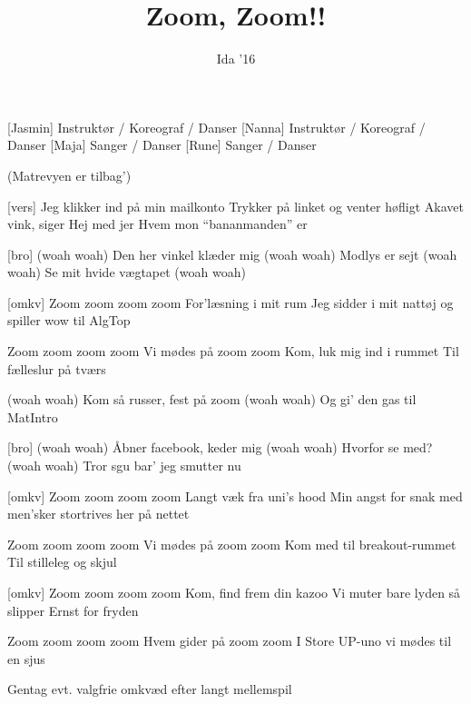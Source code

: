 \documentclass[a4paper,11pt]{article}
\title{Zoom, Zoom!!}
\author{Ida '16}
\begin{document}
\maketitle

\begin{roles}
[Jasmin] Instruktør / Koreograf / Danser
[Nanna] Instruktør / Koreograf / Danser
[Maja] Sanger / Danser
[Rune] Sanger / Danser
\end{roles}

\begin{song}
 (Matrevyen er tilbag')

[vers] Jeg klikker ind på min mailkonto
Trykker på linket og venter høfligt
Akavet vink, siger
Hej med jer
Hvem mon ``bananmanden'' er

[bro] (woah woah)
Den her vinkel klæder mig
(woah woah)
Modlys er sejt
(woah woah)
Se mit hvide vægtapet
(woah woah)

[omkv] Zoom zoom zoom zoom
For'læsning i mit rum
Jeg sidder i mit nattøj
og spiller wow til AlgTop

Zoom zoom zoom zoom
Vi mødes på zoom zoom
Kom, luk mig ind i rummet
Til fælleslur på tværs

 (woah woah)
Kom så russer, fest på zoom
(woah woah)
Og gi' den gas til MatIntro

[bro] (woah woah)
Åbner facebook, keder mig
(woah woah)
Hvorfor se med?
(woah woah)
Tror sgu bar' jeg smutter nu

[omkv] Zoom zoom zoom zoom
Langt væk fra uni's hood
Min angst for snak med men'sker
stortrives her på nettet

Zoom zoom zoom zoom
Vi mødes på zoom zoom
Kom med til breakout-rummet
Til stilleleg og skjul

[omkv] Zoom zoom zoom zoom
Kom, find frem din kazoo
Vi muter bare lyden
så slipper Ernst for fryden

Zoom zoom zoom zoom
Hvem gider på zoom zoom
I Store UP-uno
vi mødes til en sjus

 Gentag evt. valgfrie omkvæd efter langt mellemspil
\end{song}
\end{document}
